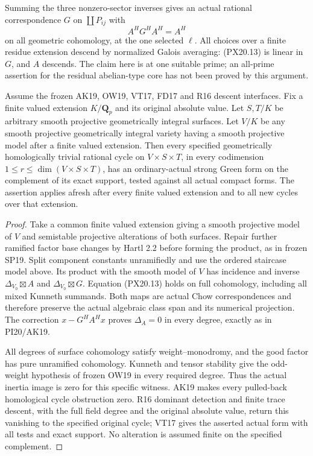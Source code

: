 Summing the three nonzero-sector inverses gives an actual rational
correspondence $G$ on $\coprod P_{ij}$ with
\[
                         A^HG^HA^H=A^H
 \tag{PX20.13}
\]
on all geometric cohomology, at the one selected $\ell$.
All choices over a finite residue extension descend by normalized
Galois averaging: (PX20.13) is linear in $G$, and $A$ descends.
The claim here is at one suitable prime; an all-prime assertion for
the residual abelian-type core has not been proved by this argument.

\begin{theorem}
\label{r20px:local}
Assume the frozen AK19, OW19, VT17, FD17 and R16 descent interfaces.
Fix a finite valued extension $K/\mathbf Q_p$ and its original
absolute value. Let $S,T/K$ be arbitrary smooth projective
geometrically integral surfaces. Let $V/K$ be any smooth projective
geometrically integral variety having a smooth projective model
after a finite valued extension. Then every specified geometrically
homologically trivial rational cycle on $V\times S\times T$, in
every codimension $1\leq r\leq\dim(V\times S\times T)$, has an
ordinary-actual strong Green form on the
complement of its exact support, tested against all actual compact
forms. The assertion applies afresh after every finite valued
extension and to all new cycles over that extension.
\end{theorem}

\begin{proof}
Take a common finite valued extension giving a smooth projective
model of $V$ and semistable projective alterations of both surfaces.
Repair further ramified factor base changes by Hartl 2.2 before
forming the product, as in frozen SP19. Split component constants
unramifiedly and use the ordered staircase model above.
Its product with the smooth model of $V$ has incidence and inverse
$\Delta_{V_0}\boxtimes A$ and $\Delta_{V_0}\boxtimes G$.
Equation (PX20.13) holds on full cohomology, including all mixed
Kunneth summands. Both maps are actual Chow correspondences and
therefore preserve the actual algebraic class span and its
numerical projection. The correction $x-G^HA^Hx$ proves
$\Delta_A=0$ in every degree, exactly as in PI20/AK19.

All degrees of surface cohomology satisfy weight--monodromy, and
the good factor has pure unramified cohomology. Kunneth and tensor
stability give the odd-weight hypothesis of frozen OW19 in every
required degree. Thus the actual inertia image is zero for this
specific witness. AK19 makes every pulled-back homological cycle
obstruction zero. R16 dominant detection and finite trace descent,
with the full field degree and the original absolute value, return
this vanishing to the specified original cycle; VT17 gives the
asserted actual form with all tests and exact support. No alteration
is assumed finite on the specified complement.
\end{proof}

